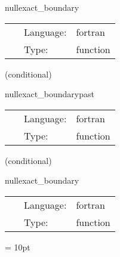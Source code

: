 \hspace{5mm} nullexact\_boundary 

\hspace{5mm}{\it exact boundary data for the characteristic evolution variables } 


\hspace{5mm}

 \begin{tabular*}{160mm}{cll} 
~ & Language:  & fortran \\ 
~ & Type:  & function \\ 
\end{tabular*} 


\vspace{5mm}

   (conditional) 

\hspace{5mm} nullexact\_boundarypast 

\hspace{5mm}{\it exact boundary data for the characteristic evolution variables, past level } 


\hspace{5mm}

 \begin{tabular*}{160mm}{cll} 
~ & Language:  & fortran \\ 
~ & Type:  & function \\ 
\end{tabular*} 


\vspace{5mm}

   (conditional) 

\hspace{5mm} nullexact\_boundary 

\hspace{5mm}{\it exact boundary data for the characteristic evolution variables } 


\hspace{5mm}

 \begin{tabular*}{160mm}{cll} 
~ & Language:  & fortran \\ 
~ & Type:  & function \\ 
\end{tabular*} 



\vspace{5mm}\parskip = 10pt 

